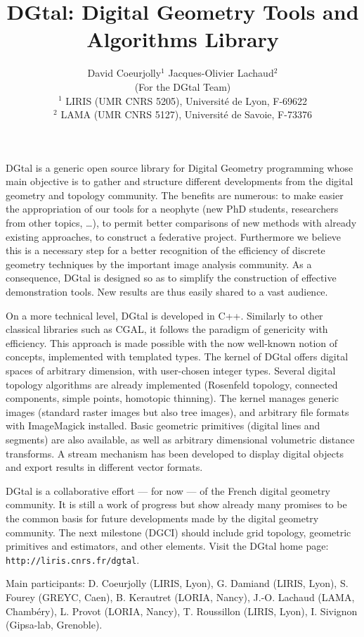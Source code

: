 \documentclass{article}
\title{DGtal: Digital  Geometry Tools and Algorithms Library}
\author{David Coeurjolly$^1$ \qquad \qquad Jacques-Olivier Lachaud$^2$ \\
  (For the DGtal Team)\\
${}^1$ LIRIS (UMR CNRS 5205), Universit\'{e} de Lyon, F-69622 \\
${}^2$ LAMA (UMR CNRS 5127), Universit\'{e} de Savoie, F-73376\\
}
\date{}
\begin{document}
\maketitle

DGtal is a generic open source library for Digital Geometry
programming whose main objective is to gather and structure different
developments from the digital geometry and topology community. The
benefits are numerous: to make easier the appropriation of our tools
for a neophyte (new PhD students, researchers from other topics,
\ldots), to permit better comparisons of new methods with already
existing approaches, to construct a federative project. Furthermore we
believe this is a necessary step for a better recognition of the
efficiency of discrete geometry techniques by the important image
analysis community. As a consequence, DGtal is designed so as to
simplify the construction of effective demonstration tools. New
results are thus easily shared to a vast audience. 

On a more technical level, DGtal is developed in C++. Similarly to
other classical libraries such as CGAL, it follows the paradigm of
genericity with efficiency. This approach is made possible with the
now well-known notion of concepts, implemented with templated
types. The kernel of DGtal offers digital spaces of arbitrary
dimension, with user-chosen integer types. Several digital topology
algorithms are already implemented (Rosenfeld topology, connected
components, simple points, homotopic thinning). The kernel manages
generic images (standard raster images but also tree images), and
arbitrary file formats with ImageMagick installed. Basic geometric
primitives (digital lines and segments) are also available, as well as
arbitrary dimensional volumetric distance transforms. A stream
mechanism has been developed to display digital objects and export
results in different vector formats.

DGtal is a collaborative effort --- for now --- of the French digital
geometry community. It is still a work of progress but show already
many promises to be the common basis for future developments made by
the digital geometry community. The next milestone (DGCI) should
include grid topology, geometric primitives and estimators, and other
elements. Visit the DGtal home page: \texttt{http://liris.cnrs.fr/dgtal}.

Main participants: D. Coeurjolly (LIRIS, Lyon), G. Damiand (LIRIS,
Lyon), S. Fourey (GREYC, Caen), B. Kerautret (LORIA, Nancy),
J.-O. Lachaud (LAMA, Chambéry), L. Provot (LORIA, Nancy),
T. Roussillon (LIRIS, Lyon), I. Sivignon (Gipsa-lab, Grenoble).
\end{document}
